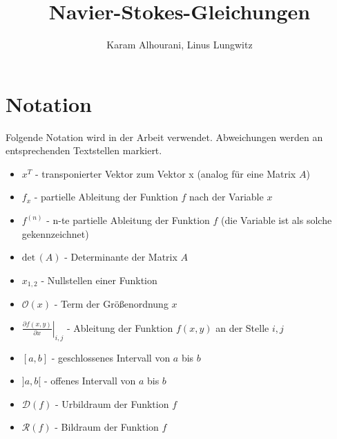 \documentclass[11pt,a4paper]{article}
\author{Karam Alhourani, Linus Lungwitz}
\title{Navier-Stokes-Gleichungen}
\newcommand{\pd}[2]{\frac{\partial #1}{\partial #2}} %
\newcommand{\determ}[1]{\text{det}\,\left(#1\right)} %
\theoremstyle{definition}
\numberwithin{equation}{section} %
\begin{document}
\maketitle

\newpage

\tableofcontents

\newpage

\section*{Notation}

Folgende Notation wird in der Arbeit verwendet. Abweichungen werden an entsprechenden Textstellen markiert.

\begin{itemize}[label={}]
    \item $x^T$ - transponierter Vektor zum Vektor x (analog für eine Matrix $A$) \\
    \item $f_x$ - partielle Ableitung der Funktion $f$ nach der Variable $x$ \\
    \item $f^{(n)}$ - n-te partielle Ableitung der Funktion $f$ (die Variable ist als solche gekennzeichnet) \\
    \item $\determ{A}$ - Determinante der Matrix $A$ \\
    \item $x_{1,2}$ - Nullstellen einer Funktion \\
    \item $\mathcal{O}(x)$ - Term der Größenordnung $x$ \\
    \item $\left.\pd{f(x,y)}{x}\right\vert_{i,j}$ - Ableitung der Funktion $f(x,y)$ an der Stelle $i,j$ \\
    \item $[a,b]$ - geschlossenes Intervall von $a$ bis $b$ \\
    \item $]a,b[$ - offenes Intervall von $a$ bis $b$ \\
    \item $\mathscr{D}(f)$ - Urbildraum der Funktion $f$ \\
    \item $\mathscr{R}(f)$ - Bildraum der Funktion $f$ \\
\end{itemize}

\newpage
\end{document}
